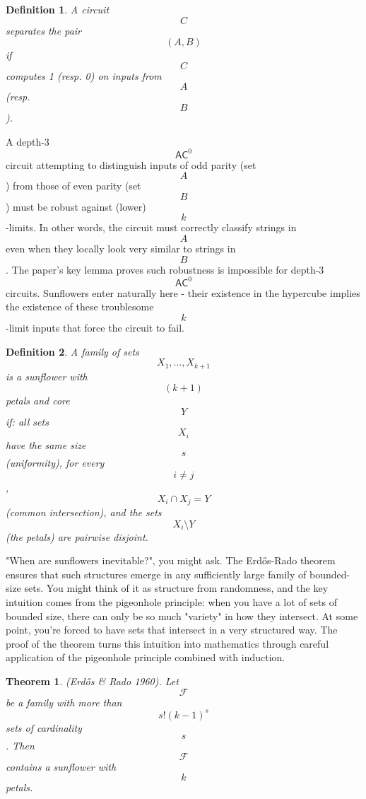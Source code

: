 \documentclass[a4, 12pt]{article}
\newtheorem{definition}{Definition}
\newtheorem{theorem}{Theorem}
\begin{document}
\begin{definition}
A circuit $$C$$ separates the pair $$(A, B)$$ if $$C$$ computes 1 (resp. 0) on inputs from $$A$$ (resp. $$B$$). 
\end{definition}
A depth-3 $$\mathsf{AC}^0$$ circuit attempting to distinguish inputs of odd parity (set $$A$$) from those of even parity (set $$B$$) must be robust against (lower) $$k$$-limits. In other words, the circuit must correctly classify strings in $$A$$ even when they locally look very similar to strings in $$B$$. The paper's key lemma proves such robustness is impossible for depth-3 $$\mathsf{AC}^0$$ circuits. Sunflowers enter naturally here - their existence in the hypercube implies the existence of these troublesome $$k$$-limit inputs that force the circuit to fail. 
\begin{definition}
A family of sets $$X_1, \ldots, X_{k+1}$$ is a sunflower with $$(k+1)$$ petals and core $$Y$$ if:
all sets $$X_i$$ have the same size $$s$$ (uniformity),
for every $$i \neq j$$, $$X_i \cap X_j = Y$$ (common intersection), and the sets $$X_i \setminus Y$$ (the petals) are pairwise disjoint.
\end{definition}
"When are sunflowers inevitable?", you might ask. The Erdős-Rado theorem ensures that such structures emerge in any sufficiently large family of bounded-size sets. You might think of it as structure from randomness, and the key intuition comes from the pigeonhole principle: when you have a lot of sets of bounded size, there can only be so much "variety" in how they intersect. At some point, you're forced to have sets that intersect in a very structured way. The proof of the theorem turns this intuition into mathematics through careful application of the pigeonhole principle combined with induction.
\begin{theorem}
(Erdős \& Rado 1960). Let $$\mathcal{F}$$ be a family with more than $$s!(k-1)^s$$ sets of cardinality $$s$$. Then $$\mathcal{F}$$ contains a sunflower with $$k$$ petals.
\end{theorem}
\end{document}
